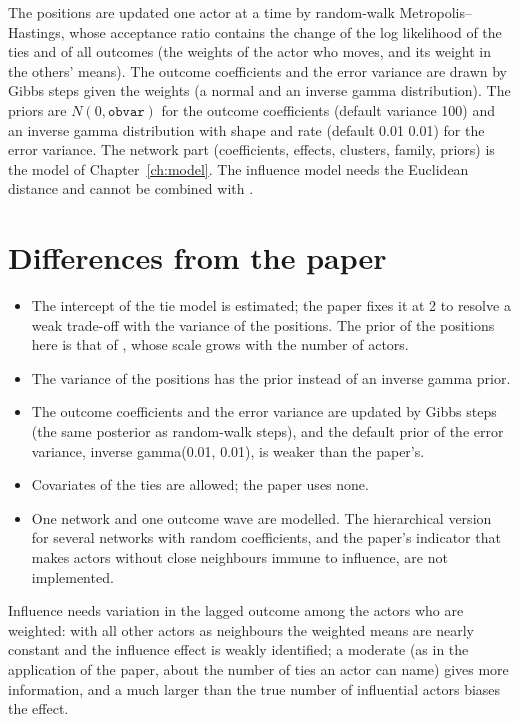 The positions are updated one actor at a time by random-walk Metropolis--Hastings, whose acceptance ratio contains the change of the log likelihood of the ties and of all outcomes (the weights of the actor who moves, and its weight in the others' means). The outcome coefficients and the error variance are drawn by Gibbs steps given the weights (a normal and an inverse gamma distribution). The priors are $N(0,\texttt{obvar})$ for the outcome coefficients (default variance 100) and an inverse gamma distribution with shape and rate  (default 0.01 0.01) for the error variance. The network part (coefficients, effects, clusters, family, priors) is the model of Chapter~\ref{ch:model}. The influence model needs the Euclidean distance and cannot be combined with .

\section{Differences from the paper}

\begin{itemize}[nosep]
  \item The intercept of the tie model is estimated; the paper fixes it at 2 to resolve a weak trade-off with the variance of the positions. The prior of the positions here is that of \latentnet{}, whose scale grows with the number of actors.
  \item The variance of the positions has the \latentnet{} prior instead of an inverse gamma prior.
  \item The outcome coefficients and the error variance are updated by Gibbs steps (the same posterior as random-walk steps), and the default prior of the error variance, inverse gamma(0.01, 0.01), is weaker than the paper's.
  \item Covariates of the ties are allowed; the paper uses none.
  \item One network and one outcome wave are modelled. The hierarchical version for several networks with random coefficients, and the paper's indicator that makes actors without close neighbours immune to influence, are not implemented.
\end{itemize}
Influence needs variation in the lagged outcome among the actors who are weighted: with all other actors as neighbours the weighted means are nearly constant and the influence effect is weakly identified; a moderate  (as in the application of the paper, about the number of ties an actor can name) gives more information, and a  much larger than the true number of influential actors biases the effect.

